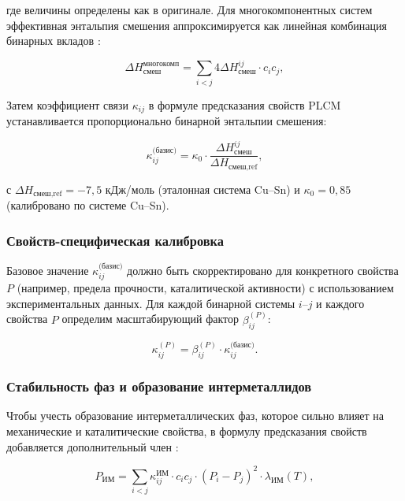 \documentclass[12pt,a4paper]{article}
\begin{document}
	где величины определены как в оригинале. Для многокомпонентных систем эффективная энтальпия смешения аппроксимируется как линейная комбинация бинарных вкладов \cite{Takeuchi2010}:
	
	\begin{equation}
		\Delta H_{\text{смеш}}^{\text{многокомп}} = \sum_{i<j} 4 \Delta H_{\text{смеш}}^{ij} \cdot c_i c_j,
		\label{eq:multicomponent}
	\end{equation}
	
	Затем коэффициент связи \(\kappa_{ij}\) в формуле предсказания свойств PLCM устанавливается пропорционально бинарной энтальпии смешения:
	
	\begin{equation}
		\kappa_{ij}^{\text{(базис)}} = \kappa_0 \cdot \frac{\Delta H_{\text{смеш}}^{ij}}{\Delta H_{\text{смеш,ref}}},
		\label{eq:kappa-miedema}
	\end{equation}
	
	с \(\Delta H_{\text{смеш,ref}} = -7,5\) кДж/моль (эталонная система Cu–Sn) и \(\kappa_0 = 0,85\) (калибровано по системе Cu–Sn).
	
	\subsubsection{Свойств-специфическая калибровка}
	
	Базовое значение \(\kappa_{ij}^{\text{(базис)}}\) должно быть скорректировано для конкретного свойства \(P\) (например, предела прочности, каталитической активности) с использованием экспериментальных данных. Для каждой бинарной системы \(i\)–\(j\) и каждого свойства \(P\) определим масштабирующий фактор \(\beta_{ij}^{(P)}\):
	
	\begin{equation}
		\kappa_{ij}^{(P)} = \beta_{ij}^{(P)} \cdot \kappa_{ij}^{\text{(базис)}}.
		\label{eq:beta-calibration}
	\end{equation}
	
	\subsubsection{Стабильность фаз и образование интерметаллидов}
	
	Чтобы учесть образование интерметаллических фаз, которое сильно влияет на механические и каталитические свойства, в формулу предсказания свойств добавляется дополнительный член \cite{Wen2019}:
	
	\begin{equation}
		P_{\text{ИМ}} = \sum_{i<j} \kappa_{ij}^{\text{ИМ}} \cdot c_i c_j \cdot (P_i - P_j)^2 \cdot \lambda_{\text{ИМ}}(T),
		\label{eq:intermetallic}
	\end{equation}
	
\end{document}
